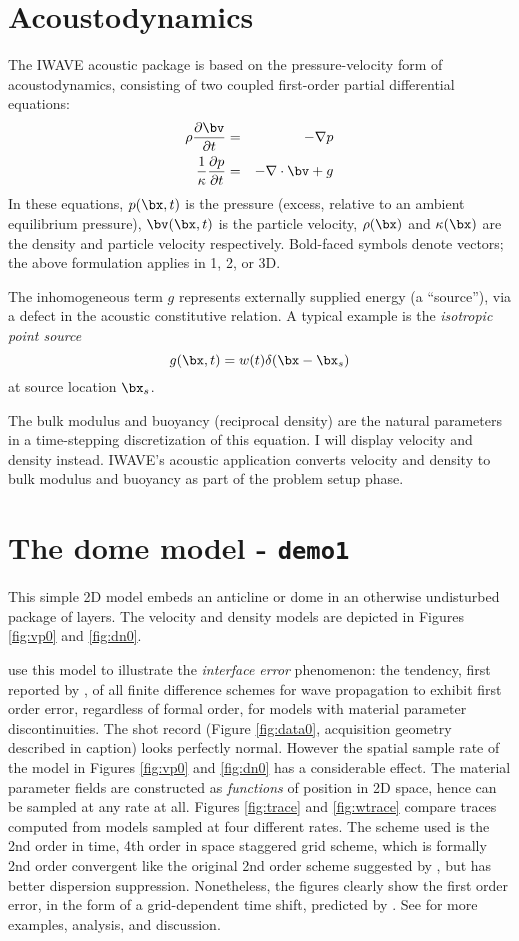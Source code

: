 \section{Acoustodynamics}
The IWAVE acoustic package is based on the pressure-velocity form of acoustodynamics, consisting of two coupled first-order partial differential equations:
\begin{eqnarray}
\label{awe}
\rho \frac{\partial \bv}{\partial t} &=& - \nabla p \\
\frac{1}{\kappa}\frac{\partial p}{\partial t} &=& -\nabla \cdot \bv + g
\end{eqnarray}
In these equations, $p(\bx,t)$ is the pressure (excess, relative to an ambient equilibrium pressure), $\bv(\bx,t)$ is the particle velocity, $\rho(\bx)$ and $\kappa(\bx)$ are the density and particle velocity respectively. Bold-faced symbols denote vectors; the above formulation applies in 1, 2, or 3D. 

The inhomogeneous term $g$ represents externally supplied energy (a
``source''), via a defect in the acoustic constitutive relation. A
typical example is the {\em isotropic point source}
\[
g(\bx,t) = w(t) \delta(\bx-\bx_s)
\]
at source location $\bx_s$.

The bulk modulus and buoyancy (reciprocal density) are the natural parameters in a time-stepping discretization of this equation. I will display velocity and density instead. IWAVE's acoustic application converts velocity and density to bulk modulus and buoyancy as part of the problem setup phase.

\section{The dome model - {\tt demo1}}

This simple 2D model embeds an anticline or dome in an otherwise
undisturbed package of layers. The velocity and density models are
depicted in Figures \ref{fig:vp0} and \ref{fig:dn0}.

\cite{SymesVdovina:09} use this model to illustrate the {\em
  interface error} phenomenon: the tendency, first reported by
\cite{Brown:84}, of all finite difference schemes for wave
propagation to exhibit first order error, regardless of formal order,
for models with material parameter discontinuities. The shot record
(Figure \ref{fig:data0}, acquisition geometry described in caption) looks
perfectly normal. However the spatial sample rate of the model in
Figures \ref{fig:vp0} and \ref{fig:dn0} has a considerable effect. The
material parameter fields are constructed as {\em functions} of
position in 2D space, hence can be sampled at any rate at all. Figures
\ref{fig:trace} and \ref{fig:wtrace} compare traces computed from models sampled
at four different rates. The scheme used is the 2nd order in time,
4th order in space staggered grid scheme, which is formally 2nd order
convergent like the original 2nd order scheme suggested by
\cite{Vir:84}, but has better dispersion suppression. Nonetheless,
the figures clearly show the first order error, in the form of a
grid-dependent time shift, predicted by \cite{Brown:84}. See
\cite[]{SymesVdovina:09} for more examples, analysis, and discussion.

